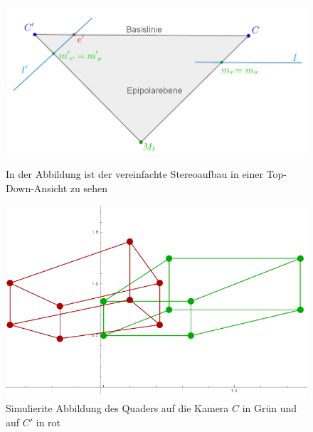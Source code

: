 


\begin{figure}[!htb]
	\includegraphics[width=\linewidth]{images/SynthetischesBeispielAufbauTopDown_beschriftet.png}
	\caption{In der Abbildung ist der vereinfachte Stereoaufbau in einer Top-Down-Ansicht zu sehen}
	\label{fig:aufbauMinimalTopDown}
	\endminipage\hfill
	\includegraphics[width=\linewidth]{images/QuadrateMinimalBeispiel.png}
	\caption{Simulierite Abbildung des Quaders auf die Kamera $C$ in Grün und auf $C'$ in rot}
	\label{fig:AbbildungenMinimal}
	\endminipage\hfill
\end{figure}

